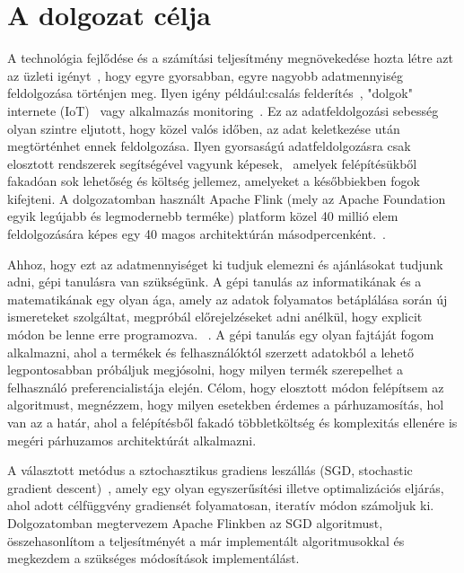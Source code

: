 \documentclass[a4paper,12pt]{article}
\begin{document}
\section{A dolgozat célja}
A technológia fejlődése és a számítási teljesítmény megnövekedése hozta létre azt az üzleti igényt~\cite{rta}, hogy egyre gyorsabban, egyre nagyobb adatmennyiség feldolgozása történjen meg. Ilyen igény például:csalás felderítés~\cite{fraud}, "dolgok" internete (IoT)~\cite{iot} vagy alkalmazás monitoring~\cite{ganalitycs}. Ez az adatfeldolgozási sebesség olyan szintre eljutott, hogy közel valós időben, az adat keletkezése után megtörténhet ennek feldolgozása. Ilyen gyorsaságú adatfeldolgozásra csak elosztott rendszerek segítségével vagyunk képesek,~\cite{ucl} amelyek felépítésükből fakadóan sok lehetőség és költség jellemez, amelyeket a későbbiekben fogok kifejteni. A dolgozatomban használt Apache Flink (mely az Apache Foundation egyik legújabb és legmodernebb terméke) platform közel 40 millió elem feldolgozására képes egy 40 magos architektúrán másodpercenként.~\cite{flink}.  \linebreak

Ahhoz, hogy ezt az adatmennyiséget ki tudjuk elemezni és ajánlásokat tudjunk adni, gépi tanulásra van szükségünk. A gépi tanulás az informatikának és a matematikának egy olyan ága, amely az adatok folyamatos betáplálása során új ismereteket szolgáltat, megpróbál előrejelzéseket adni anélkül, hogy explicit módon be lenne erre programozva. ~\cite{ml}. A gépi tanulás egy olyan fajtáját fogom alkalmazni, ahol a termékek és felhasználóktól szerzett adatokból a lehető legpontosabban próbáljuk megjósolni, hogy milyen termék szerepelhet a felhasználó preferencialistája elején. Célom, hogy elosztott módon felépítsem az algoritmust, megnézzem, hogy milyen esetekben érdemes a párhuzamosítás, hol van az a határ, ahol a felépítésből fakadó többletköltség és komplexitás ellenére is megéri párhuzamos architektúrát alkalmazni. 
\linebreak

A választott metódus a sztochasztikus gradiens leszállás (SGD, stochastic gradient descent)~\cite{sgd}, amely egy olyan egyszerűsítési illetve optimalizációs eljárás, ahol adott célfüggvény gradiensét folyamatosan, iteratív módon számoljuk ki. Dolgozatomban megtervezem Apache Flinkben az SGD algoritmust, összehasonlítom a teljesítményét a már implementált algoritmusokkal és megkezdem a szükséges módosítások implementálást.
\end{document}
